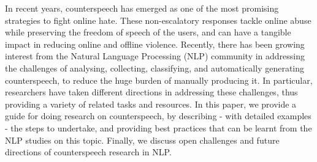 In recent years, counterspeech has emerged as one of the most promising strategies to fight online hate. These non-escalatory responses tackle online abuse while preserving the freedom of speech of the users, and can have a tangible impact in reducing online and offline violence. Recently, there has been growing interest from the Natural Language Processing (NLP) community in addressing the challenges of analysing, collecting, classifying, and automatically generating counterspeech, to reduce the huge burden of manually producing it. In particular, researchers have taken different directions in addressing these challenges, thus providing a variety of related tasks and resources. In this paper, we provide a guide for doing research on counterspeech, by describing - with detailed examples - the steps to undertake, and providing best practices that can be learnt from the NLP studies on this topic. Finally, we discuss open challenges and future directions of counterspeech research in NLP.